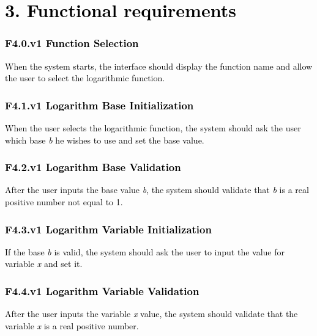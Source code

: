 \documentclass[letterpaper]{article}
\begin{document}
\section[3. Functional requirements]{\textbf{\textcolor{black}{3. Functional requirements}}}
\subsubsection[F4.0.v1 Function Selection ]{\textbf{\textcolor{black}{F4.0.v1 Function Selection }}}
\textcolor{black}{When the system starts, the interface should display the function name and allow the user to select
the logarithmic function.}

\subsubsection[F4.1.v1 Logarithm Base Initialization ]{\textbf{\textcolor{black}{F4.1.v1 Logarithm Base Initialization
}}}
\textcolor{black}{When the user selects the logarithmic function, the system should ask the user which base
}\textit{\textcolor{black}{b}}\textcolor{black}{ he wishes to use and set the base value.}

\subsubsection[F4.2.v1 Logarithm Base Validation]{\textbf{\textcolor{black}{F4.2.v1 Logarithm Base Validation}}}
\textcolor{black}{After the user inputs the base value }\textit{\textcolor{black}{b}}\textcolor{black}{, the system
should validate that }\textit{\textcolor{black}{b}}\textcolor{black}{ is a real positive number not equal to 1.}

\subsubsection[F4.3.v1 Logarithm Variable Initialization]{\textbf{\textcolor{black}{F4.3.v1 Logarithm Variable
Initialization}}}
\textcolor{black}{If the base }\textit{\textcolor{black}{b}}\textcolor{black}{ is valid, the system should ask the user
to input the value for variable }\textit{\textcolor{black}{x }}\textcolor{black}{and set it.}

\subsubsection[F4.4.v1 Logarithm Variable Validation]{\textbf{\textcolor{black}{F4.4.v1 Logarithm Variable Validation}}}
\textcolor{black}{After the user inputs the variable }\textit{\textcolor{black}{x}}\textcolor{black}{ value, the system
should validate that the variable }\textit{\textcolor{black}{x}}\textcolor{black}{ is a real positive number.}
\end{document}
